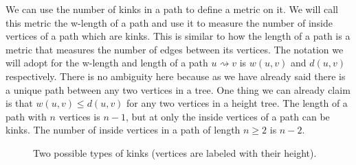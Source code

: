 We can use the number of kinks in a path to define a metric on it. We will call this metric the w-length of a path and use it to measure the number of inside vertices of a path which are kinks. This is similar to how the length of a path is a metric that measures the number of edges between its vertices. The notation we will adopt for the w-length and length of a path $u \rightsquigarrow v$ is $w(u, v)$ and $d(u, v)$ respectively. There is no ambiguity here because as we have already said there is a unique path between any two vertices in a tree. One thing we can already claim is that $w(u, v) \le d(u, v)$ for any two vertices in a height tree. The length of a path with $n$ vertices is $n-1$, but at only the inside vertices of a path can be kinks. The number of inside vertices in a path of length $n \ge 2$ is $n - 2$.

\begin{figure}[h]%
    \centering
    \qquad \qquad \qquad
    \caption{Two possible types of kinks (vertices are labeled with their height).}%
    \label{fig:a-tale-of-two-kinks}%
\end{figure}


